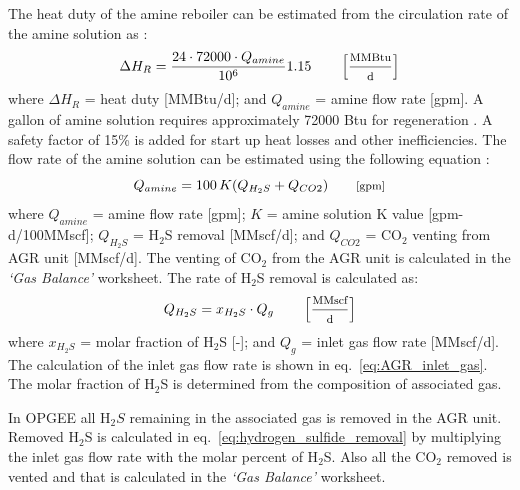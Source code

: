\documentclass[11pt]{report}
\newcommand{\marg}[1]{{\footnotesize\textit{\textcolor{stanford}{'#1'}}}}
\newcommand{\marginnote}[1]{\marginpar{\marg{#1}}}
\newcommand{\sheet}[1]{\textit{`{#1}'}}
\begin{document}
The heat duty of the amine reboiler can be estimated from the circulation rate of the amine solution as \cite[p. 119---originally Jones and Perry, 1973]{Manning1991}:  \marginnote{Surface \\ Processing 2.2.1.4}
\begin{equation} \label{eq:gas_AGR_heat}
\Delta H_{R}= \frac{24\cdot72000 \cdot Q_{amine}}{10^6}  1.15  \quad\quad \begin{footnotesize}\left[ \frac{\text{MMBtu}}{\text{d}} \right] \end{footnotesize}
\end{equation}
where $\Delta H_{R}$ = heat duty [MMBtu/d]; and $Q_{amine}$ = amine flow rate [gpm].   A gallon of amine solution requires approximately 72000 Btu for regeneration \cite{Jones1973}. A safety factor of 15\% is added for start up heat losses and other inefficiencies. The flow rate of the amine solution can be estimated using the following equation \cite[p. 115]{Manning1991}:  \marginnote{Surface \\ Processing 2.2.1.1.1}
\begin{equation} \label{eq:amine_flow_rate}
Q_{amine}=100\,K (Q_{ H_{2}S}+  Q_{CO2}) \quad\quad \begin{footnotesize}\text{[gpm]} \end{footnotesize}
\end{equation}
where $Q_{amine}$ = amine flow rate [gpm]; $K$ = amine solution K value [gpm-d/100MMscf]; $Q_{H_{2}S}$ = H$_{2}$S removal [MMscf/d]; and $Q_{CO2}$ = CO$_{2}$ venting from AGR unit [MMscf/d]. The venting of CO$_{2}$ from the AGR unit is calculated in the \sheet{Gas Balance} worksheet. The rate of H$_{2}$S removal is calculated as:
\begin{equation} \label{eq:hydrogen_sulfide_removal}
Q_{ H_{2}S} = x_{H_{2}S}\cdot Q_{g} \quad\quad \begin{footnotesize}\left[ \frac{\text{MMscf}}{\text{d}} \right] \end{footnotesize}
\end{equation}
where $x_{H_{2}S}$ = molar fraction of H$_{2}$S [-]; and $Q_{g}$ = inlet gas flow rate [MMscf/d]. The calculation of the inlet gas flow rate is shown in eq.\ \eqref{eq:AGR_inlet_gas}. The molar fraction of H$_{2}$S is determined from the composition of associated gas.

In OPGEE all H$_{2}S$ remaining in the associated gas is removed in the AGR unit. Removed H$_2$S is calculated in eq.\ \eqref{eq:hydrogen_sulfide_removal} by multiplying the inlet gas flow rate with the molar percent of H$_{2}$S. Also all the CO$_{2}$ removed is vented and that is calculated in the \sheet{Gas Balance} worksheet.
\end{document}
